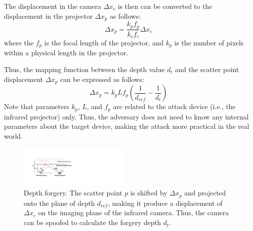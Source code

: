 The displacement in the camera $\Delta x_c$ is then can be converted to the displacement in the projector $\Delta x_p$ as follows:
\begin{equation}
	\Delta x_p = \frac{k_pf_p}{k_cf_c}\Delta x_c 
	\label{xc_to_xp}
\end{equation}
where the $f_p$ is the focal length of the projector, and $k_p$ is the number of pixels within a physical length in the projector.

Thus, the mapping function between the depth value $d_t$ and the scatter point displacement $\Delta x_p$ can be expressed as follows:
\begin{equation}
	\Delta x_p = k_pLf_p(\frac{1}{d_{ref}} - \frac{1}{d_t}) 
	\label{xp_to_d}
\end{equation}
Note that parameters $k_p$, $L$, and $f_p$ are related to the attack device (i.e., the infrared projector) only. Thus, the adversary does not need to know any internal parameters about the target device, making the attack more practical in the real world. 

\begin{figure}[!t]
	\centering
	\includegraphics[width=0.48\textwidth]{figures/depth_forgery.pdf} 
	\vspace{-0.1in}
 	\caption{Depth forgery. The scatter point $p$ is shifted by $\Delta x_p$ and projected onto the plane of depth $d_{ref}$, making it produce a displacement of $\Delta x_c$ on the imaging plane of the infrared camera. Thus, the camera can be spoofed to calculate the forgery depth $d_t$.}
	\label{depth_forgery}
	\vspace{-0.15in}
\end{figure}


